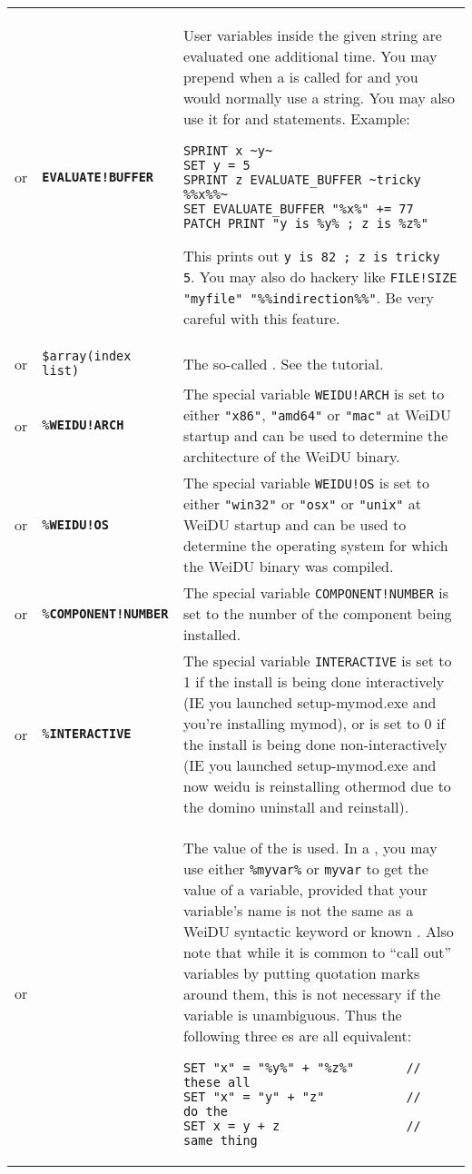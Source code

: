 \documentclass{article}
\def\ttref#1{\ahrefloc{#1}{\tt #1}}
\def\DEFINE#1{{\tt \bf #1}\label{#1}\index{#1}}
\def\DEFSYN#1{{\tt \bf #1}\index{#1}}
\def\t#1{{\tt #1}}
\begin{document}
\begin{tabular}{cp{10in}|p{10in}}
or & \DEFSYN{EVALUATE!BUFFER} \ttref{variable} &
    User variables inside the given string are evaluated one additional
    time. You may prepend \ttref{EVALUATE!BUFFER} when a \ttref{value} is
    called for and you would normally use a string. You may also use it for
\ttref{SET} and \ttref{SPRINT} statements. Example:
\begin{verbatim}
SPRINT x ~y~
SET y = 5
SPRINT z EVALUATE_BUFFER ~tricky %%x%%~
SET EVALUATE_BUFFER "%x%" += 77
PATCH_PRINT "y is %y% ; z is %z%"
\end{verbatim}
    This prints out \t{y is 82 ; z is tricky 5}. You may also do hackery like
    \t{FILE!SIZE "myfile" "\%\%indirection\%\%"}. Be very careful with this
    feature. \\
or & \verb+$array(index list)+ &
    The so-called \ttref{array construct}. See the tutorial.
\\

or & \t{\%}\DEFINE{WEIDU!ARCH}\t{\%} & The special variable \t{WEIDU!ARCH}
is set to either \t{"x86"}, \t{"amd64"} or \t{"mac"} at WeiDU startup and can be used to
determine the architecture of the WeiDU binary. \\

or & \t{\%}\DEFINE{WEIDU!OS}\t{\%} & The special variable \t{WEIDU!OS} is set to either
\t{"win32"} or \t{"osx"} or \t{"unix"} at WeiDU startup and can be used to
determine the operating system for which the WeiDU binary was compiled. \\

or & \t{\%}\DEFINE{COMPONENT!NUMBER}\t{\%} & The special variable \t{COMPONENT!NUMBER}
is set to the number of the component being installed. \\

or & \t{\%}\DEFINE{INTERACTIVE}\t{\%} & The special variable \t{INTERACTIVE}
is set to 1 if the install is being done interactively (IE you launched setup-mymod.exe and you're
installing mymod), or is set to 0 if the install is being done non-interactively (IE you launched
setup-mymod.exe and now weidu is reinstalling othermod due to the domino uninstall and reinstall). \\

or & \ttref{variable} &
    The value of the \ttref{variable} is used.
  In a \ttref{patch} \ttref{value}, you may use either \t{\%myvar\%} or
  \t{myvar} to get the value of a variable, provided that your variable's
  name is not the same as a WeiDU syntactic keyword or known
  \ttref{constant}. Also note that while it is common to ``call out''
  variables by putting quotation marks around them, this is not necessary
  if the variable is unambiguous. Thus the following three \ttref{patch}es
  are all equivalent:
\begin{verbatim}
SET "x" = "%y%" + "%z%"       // these all
SET "x" = "y" + "z"           //    do the
SET x = y + z                 //  same thing
\end{verbatim} \\


\end{tabular}
\end{document}
